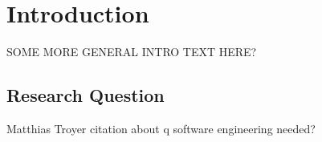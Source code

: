 \chapter{Introduction}\label{sec:introduction}

SOME MORE GENERAL INTRO TEXT HERE?



\section{Research Question}
\label{subsec:researchquestion}

Matthias Troyer citation about q software engineering needed?